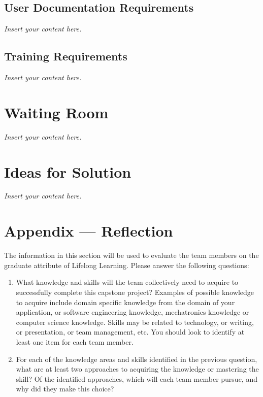 \documentclass[12pt]{article}
\newcommand{\lips}{\textit{Insert your content here.}}
\begin{document}
\subsection{User Documentation Requirements}
\lips
\subsection{Training Requirements}
\lips

\section{Waiting Room}
\lips

\section{Ideas for Solution}
\lips

\newpage{}
\section*{Appendix --- Reflection}

The information in this section will be used to evaluate the team members on the
graduate attribute of Lifelong Learning.  Please answer the following questions:

\begin{enumerate}
  \item What knowledge and skills will the team collectively need to acquire to
  successfully complete this capstone project?  Examples of possible knowledge
  to acquire include domain specific knowledge from the domain of your
  application, or software engineering knowledge, mechatronics knowledge or
  computer science knowledge.  Skills may be related to technology, or writing,
  or presentation, or team management, etc.  You should look to identify at
  least one item for each team member.
  \item For each of the knowledge areas and skills identified in the previous
  question, what are at least two approaches to acquiring the knowledge or
  mastering the skill?  Of the identified approaches, which will each team
  member pursue, and why did they make this choice?
\end{enumerate}
\end{document}
